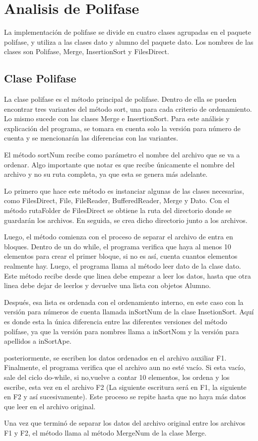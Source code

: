 \documentclass[11pt]{article}
\begin{document}
\section{Analisis de Polifase}
La implementación de polifase se divide en cuatro clases agrupadas en el paquete polifase, y utiliza a las  clases dato y alumno del paquete dato.
Los nombres de las clases son Polifase, Merge, InsertionSort y FilesDirect.

\subsection{Clase Polifase}
La clase polifase es el método principal de polifase. Dentro de ella se pueden encontrar tres variantes del método sort, una para cada criterio de ordenamiento. Lo mismo sucede con las clases Merge e InsertionSort. Para este análisis y explicación del programa, se tomara en cuenta solo la versión para número de cuenta y se mencionarán las diferencias con las variantes.
\par
El método sortNum recibe como parámetro el nombre del archivo que se va a ordenar. Algo importante que notar es que recibe únicamente el nombre del archivo y no su ruta completa, ya que esta se genera más adelante. 
\par
Lo primero que hace este método es instanciar algunas de las clases necesarias, como FilesDirect, File, FileReader, BufferedReader, Merge y Dato. Con el método rutaFolder de FilesDirect se obtiene la ruta del directorio donde se guardarán los archivos. En seguida, se crea dicho directorio junto a los archivos.
\par
Luego, el método comienza con el proceso de separar el archivo de entra en bloques. Dentro de un do while, el programa verifica que haya al menos 10 elementos para crear el primer bloque, si no es así, cuenta cuantos elementos realmente hay. Luego, el programa llama al método leer dato de la clase dato. Este método recibe desde que linea debe empezar a leer los datos, hasta que otra linea debe dejar de leerlos y devuelve una lista con objetos Alumno.
\par
Después, esa lista es ordenada con el ordenamiento interno, en este caso con la versión para números de cuenta llamada inSortNum de la clase InsetionSort. Aquí es donde esta la única diferencia entre las diferentes versiones del método polifase, ya que la versión para nombres llama a inSortNom y la versión para apellidos a inSortApe.
\par
posteriormente, se escriben los datos ordenados en el archivo auxiliar F1. Finalmente, el programa verifica que el archivo aun no esté vacío. Si esta vacío, sale del ciclo do-while, si no,vuelve a contar 10 elementos, los ordena y los escribe, esta vez en el archivo F2 (La siguiente escritura será en F1, la siguiente en F2 y así sucesivamente). Este proceso se repite hasta que no haya más datos que leer en el archivo original.
\par
Una vez que terminó de separar los datos del archivo original entre los archivos F1 y F2, el método llama al método MergeNum de la clase Merge.
\end{document}
